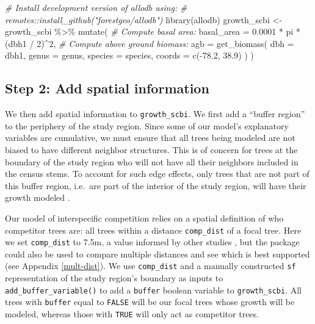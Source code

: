 \documentclass[12pt]{article}
\newenvironment{Shaded}{\begin{snugshade}}{\end{snugshade}}
\newcommand{\AttributeTok}[1]{\textcolor[rgb]{0.77,0.63,0.00}{#1}}
\newcommand{\CommentTok}[1]{\textcolor[rgb]{0.56,0.35,0.01}{\textit{#1}}}
\newcommand{\DecValTok}[1]{\textcolor[rgb]{0.00,0.00,0.81}{#1}}
\newcommand{\FloatTok}[1]{\textcolor[rgb]{0.00,0.00,0.81}{#1}}
\newcommand{\FunctionTok}[1]{\textcolor[rgb]{0.00,0.00,0.00}{#1}}
\newcommand{\NormalTok}[1]{#1}
\newcommand{\OtherTok}[1]{\textcolor[rgb]{0.56,0.35,0.01}{#1}}
\newcommand{\SpecialCharTok}[1]{\textcolor[rgb]{0.00,0.00,0.00}{#1}}
\begin{document}
\begin{Shaded}
\begin{Highlighting}[]
\CommentTok{\# Install development version of allodb using:}
\CommentTok{\# remotes::install\_github("forestgeo/allodb")}
\FunctionTok{library}\NormalTok{(allodb)}
\NormalTok{growth\_scbi }\OtherTok{\textless{}{-}}\NormalTok{ growth\_scbi }\SpecialCharTok{\%\textgreater{}\%}
  \FunctionTok{mutate}\NormalTok{(}
    \CommentTok{\# Compute basal area:}
    \AttributeTok{basal\_area =} \FloatTok{0.0001} \SpecialCharTok{*}\NormalTok{ pi }\SpecialCharTok{*}\NormalTok{ (dbh1 }\SpecialCharTok{/} \DecValTok{2}\NormalTok{)}\SpecialCharTok{\^{}}\DecValTok{2}\NormalTok{,}
    \CommentTok{\# Compute above ground biomass:}
    \AttributeTok{agb =} \FunctionTok{get\_biomass}\NormalTok{(}
      \AttributeTok{dbh =}\NormalTok{ dbh1,}
      \AttributeTok{genus =}\NormalTok{ genus,}
      \AttributeTok{species =}\NormalTok{ species,}
      \AttributeTok{coords =} \FunctionTok{c}\NormalTok{(}\SpecialCharTok{{-}}\FloatTok{78.2}\NormalTok{, }\FloatTok{38.9}\NormalTok{)}
\NormalTok{    )}
\NormalTok{  )}
\end{Highlighting}
\end{Shaded}

\hypertarget{spatial-information}{%
\subsection{Step 2: Add spatial information}\label{spatial-information}}

We then add spatial information to \texttt{growth\_scbi}. We first add a
``buffer region'' to the periphery of the study region. Since some of
our model's explanatory variables are cumulative, we must ensure that
all trees being modeled are not biased to have different neighbor
structures. This is of concern for trees at the boundary of the study
region who will not have all their neighbors included in the census
stems. To account for such edge effects, only trees that are not part of
this buffer region, i.e.~are part of the interior of the study region,
will have their growth modeled \citep{waller_applied_2004}.

Our model of interspecific competition relies on a spatial definition of
who competitor trees are: all trees within a distance
\texttt{comp\_dist} of a focal tree. Here we set \texttt{comp\_dist} to
7.5m, a value informed by other studies
\citep[\citet{uriarte_spatially_2004},
\citet{canham_neighborhood_2006}]{canham_neighborhood_2004}, but the
package could also be used to compare multiple distances and see which
is best supported (see Appendix \ref{mult-dist}). We use
\texttt{comp\_dist} and a manually constructed \texttt{sf}
representation of the study region's boundary as inputs to
\texttt{add\_buffer\_variable()} to add a \texttt{buffer} boolean
variable to \texttt{growth\_scbi}. All trees with \texttt{buffer} equal
to \texttt{FALSE} will be our focal trees whose growth will be modeled,
whereas those with \texttt{TRUE} will only act as competitor trees.
\end{document}
